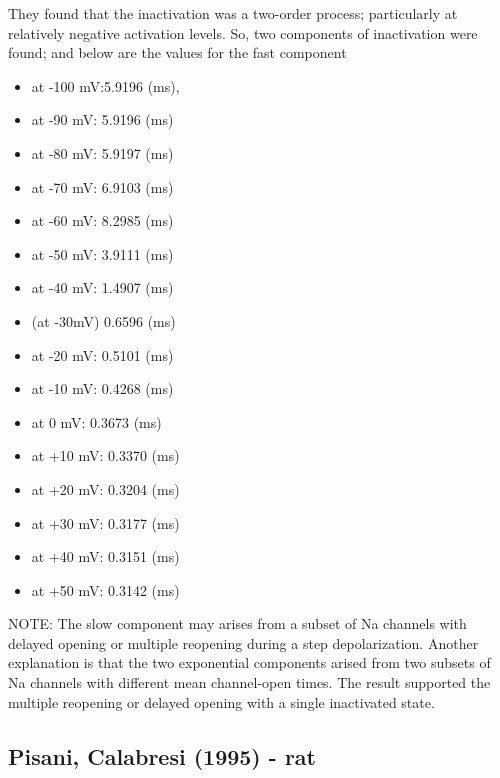 \begin{enumerate}
  They found that the inactivation was a two-order process; particularly at
  relatively negative activation levels. So, two components of inactivation were
  found; and below are the values for the fast component
\begin{itemize}
    \item at -100 mV:5.9196 (ms),  
    \item at -90 mV: 5.9196 (ms)
    \item at -80 mV: 5.9197 (ms)
    \item at -70 mV: 6.9103 (ms)
    \item at -60 mV: 8.2985 (ms)
    \item at -50 mV: 3.9111 (ms)
    \item at -40 mV: 1.4907 (ms)
    \item (at -30mV) 0.6596 (ms)
    \item at -20 mV: 0.5101 (ms)
    \item at -10 mV: 0.4268 (ms)
    \item at 0 mV: 0.3673 (ms)
    \item at +10 mV: 0.3370 (ms)
    \item at +20 mV: 0.3204 (ms)
    \item at +30 mV: 0.3177 (ms)
    \item at +40 mV: 0.3151 (ms)
    \item at +50 mV: 0.3142 (ms)
\end{itemize}   
NOTE: The slow component may arises from a subset of Na channels with delayed
opening or multiple reopening during a step depolarization. 
Another explanation is that the two exponential components arised from two
subsets of Na channels with different mean channel-open times.
The result supported the multiple reopening or delayed opening with a single
inactivated state.
  
\end{enumerate}

\subsection{Pisani, Calabresi (1995) - rat}
\label{sec:drug-felbamate-FBM}
\label{sec:felbamate}
\label{sec:Nat-striatal-neuron-Pisani-calabresi-1995}
\label{sec:FBM}

